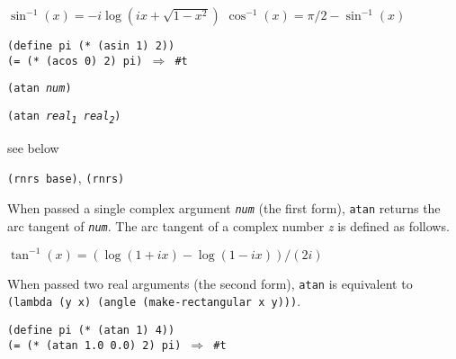 \(\sin^{-1}(x)=-i\log(ix+\sqrt{1-x^2})\)
\(\cos^{-1}(x)=\pi{}/2-\sin^{-1}(x)\)


\begin{alltt}
(define pi (* (asin 1) 2))
(= (* (acos 0) 2) pi) \(\Rightarrow\) \#{}t
\end{alltt}

\begin{description}

\label{objects_s133}\item[procedure] \texttt{(atan \textit{num})}



\item[procedure] \texttt{(atan \textit{real\textsubscript{1}} \textit{real\textsubscript{2}})}



\item[returns] see below


\item[libraries] \texttt{(rnrs base)}, \texttt{(rnrs)}
\end{description}


When passed a single complex argument \texttt{\textit{num}} (the first form), \texttt{atan}
returns the arc tangent of \texttt{\textit{num}}.
The arc tangent of a complex number \textit{z} is defined as follows.


\(\tan^{-1}(x)=(\log(1+ix)-\log(1-ix))/(2i)\)


When passed two real arguments (the second form), \texttt{atan} is equivalent
to \texttt{(lambda (y x) (angle (make-rectangular x y)))}.


\begin{alltt}
(define pi (* (atan 1) 4))
(= (* (atan 1.0 0.0) 2) pi) \(\Rightarrow\) \#{}t
\end{alltt}

